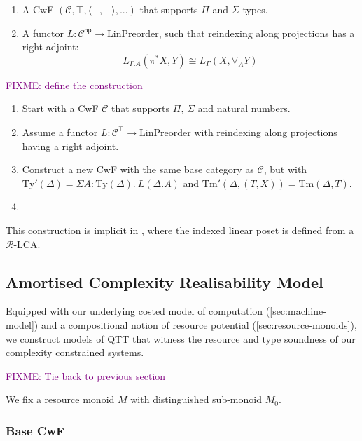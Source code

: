 \documentclass[acmsmall,review]{acmart}
\newcommand{\Ty}{\mathrm{Ty}}
\newcommand{\Tm}{\mathrm{Tm}}
\newcommand{\cat}[1]{\mathcal{#1}}
\newcommand{\op}{\mathsf{op}}
\newcommand{\LinPreorder}{\mathrm{LinPreorder}}
\newcommand{\bob}[1]{\textcolor{purple}{FIXME: #1}}
\begin{document}
\begin{definition}
  \begin{enumerate}
  \item A CwF $(\cat{C}, \top, \langle-,-\rangle, ...)$ that supports
    $\Pi$ and $\Sigma$ types.
  \item A functor $L : \cat{C}^\op \to \LinPreorder$, such that
    reindexing along projections has a right adjoint:
    \begin{displaymath}
      L_{\Gamma.A}(\pi^*X, Y) \cong L_{\Gamma}(X, \forall_A Y)
    \end{displaymath}
  \end{enumerate}
\end{definition}

\bob{define the construction}
\begin{enumerate}
\item Start with a CwF $\cat{C}$ that supports $\Pi$, $\Sigma$ and
  natural numbers.
\item Assume a functor $L : \cat{C}^\top \to \LinPreorder$ with
  reindexing along projections having a right adjoint.
\item Construct a new CwF with the same base category as $\cat{C}$,
  but with $\Ty'(\Delta) = \Sigma A : \Ty(\Delta).~L(\Delta.A)$ and
  $\Tm'(\Delta, (T, X)) = \Tm(\Delta, T)$.
\item
\end{enumerate}

This construction is implicit in \cite{atkey2018qtt}, where the
indexed linear poset is defined from a $\mathcal{R}$-LCA.


\subsection{Amortised Complexity Realisability Model}
\label{sec:realisability-model}

Equipped with our underlying costed model of computation
(\autoref{sec:machine-model}) and a compositional notion of resource
potential (\autoref{sec:resource-monoids}), we construct models of QTT
that witness the resource and type soundness of our complexity
constrained systems.

\bob{Tie back to previous section}

We fix a resource monoid $M$ with distinguished sub-monoid $M_0$.

\subsubsection{Base CwF}
\label{sec:realisability-base-cwf}
\end{document}

